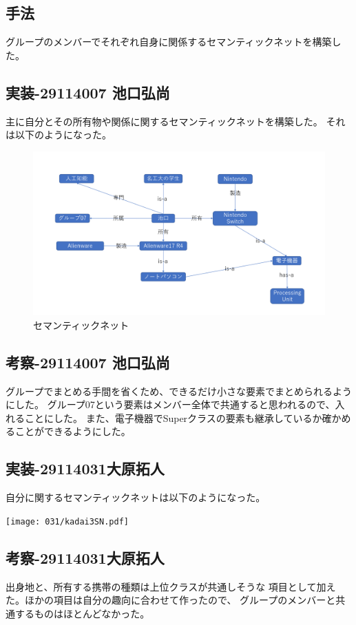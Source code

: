 \documentclass{jarticle}
\begin{document}
\subsection{手法}
    グループのメンバーでそれぞれ自身に関係するセマンティックネットを構築した。
\subsection{実装-29114007 池口弘尚}
主に自分とその所有物や関係に関するセマンティックネットを構築した。
それは以下のようになった。

\begin{figure}[!hbt]
  \centering
  \includegraphics[bb=0 0 1277 719,width=1.2\linewidth]{007/semNet.png}
  \caption{セマンティックネット}
  \label{fig:semNet}
\end{figure}
\subsection{考察-29114007 池口弘尚}
グループでまとめる手間を省くため、できるだけ小さな要素でまとめられるようにした。
グループ07という要素はメンバー全体で共通すると思われるので、入れることにした。
また、電子機器でSuperクラスの要素も継承しているか確かめることができるようにした。
\subsection{実装-29114031大原拓人}
    自分に関するセマンティックネットは以下のようになった。
\begin{center}
    \texttt{[image: 031/kadai3SN.pdf]}
\end{center}
\subsection{考察-29114031大原拓人}
    出身地と、所有する携帯の種類は上位クラスが共通しそうな
    項目として加えた。ほかの項目は自分の趣向に合わせて作ったので、
    グループのメンバーと共通するものはほとんどなかった。
\end{document}
